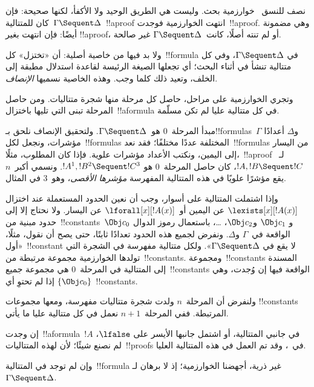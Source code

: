 \documentclass[../../../include/open-logic-section]{subfiles}
\begin{document}


نصف للنسق~ خوارزمية بحث. وليست هي الطريق الوحيد ولا الأكفأ،
لكنها صحيحة: فإن كان للمتتالية~$\Gamma\Sequent\Delta$~!!a{proof} انتهت
الخوارزمية فوجدت~!!a{proof}. وهي مضمونة أيضًا: فإن انتهت بغير
!!a{proof}، أو لم تنته أصلًا، كانت~$\Gamma\Sequent\Delta$ غير صالحة.

ولا بد فيها من خاصية أصلية: أن «تختزل» كل~!!{formula} في
$\Gamma\Sequent\Delta$، وفي كل متتالية تنشأ في أثناء البحث؛ أي تجعلها
الصيغة الرئيسة لقاعدة استدلال مطبقة إلى الخلف، وتعيد ذلك كلما وجب. وهذه
الخاصية نسميها \emph{الإنصاف}.

وتجري الخوارزمية على مراحل، حاصل كل مرحلة منها شجرة متتاليات. ومن حاصل
المرحلة تبنى التي تليها باختزال~!!a{formula} في كل متتالية عليا لم تكن
مسلّمة.

مبدأ المرحلة~$0$ هو~$\Gamma\Sequent\Delta$. ولتحقيق الإنصاف نلحق
بـ!!{formula}s~$\Gamma$ و$\Delta$ أعدادًا مؤشرات، ونجعل لكل~!!{formula}s
المختلفة عددًا مختلفًا؛ فقد نعد~!!{formula}s من اليسار إلى اليمين، ونكتب
الأعداد مؤشرات علوية. فإذا كان المطلوب، مثلًا،~!!a{proof}
لـ~$!A,!B\Sequent !C$، كان حاصل المرحلة~$0$ هو
$!A^1,!B^2\Sequent !C^3$. ونسمي أكبر~$n$ يقع مؤشرًا علويًا في هذه
المتتالية المفهرسة \emph{مؤشرها الأقصى}، وهو~$3$ في المثال.

وإذا اشتملت المتتالية على أسوار، وجب أن نعين الحدود المستعملة عند اختزال
$\lexists[x][!A(x)]$ عن اليمين أو~$\lforall[x][!A(x)]$ عن اليسار.
ولا نحتاج إلا إلى حدود مبنية من~!!{constant}s~$\Obj c_0$ و
$\Obj c_1$ و$\Obj c_2$، \dots، باستعمال رموز الدوال الواقعة في~$\Gamma$
و$\Delta$. ونفرض لجميع هذه الحدود تعدادًا ثابتًا، حتى يصح أن نقول، مثلًا،
«أول~!!{constant} لا يقع في
$\Gamma\Sequent\Delta$». ولكل متتالية مفهرسة في الشجرة التي تولدها
الخوارزمية مجموعة مرتبطة من~!!{constant}s. ومجموعة~!!{constant}s المسندة إلى المتتالية
في المرحلة~$0$ هي مجموعة جميع~!!{constant}s الواقعة فيها إن وُجدت، وهي
$\{\Obj c_0\}$ إذا لم تحتوِ أي~!!{constant}s.

ولنفرض أن المرحلة~$n$ ولدت شجرة متتاليات مفهرسة، ومعها مجموعات
!!{constant}s المرتبطة. ففي المرحلة~$n+1$ نعمل في كل متتالية عليا ما يأتي.

إن وجدت~!!a{formula}~$!A$ في جانبي المتتالية، أو اشتمل جانبها الأيسر على
$\lfalse$، لم نصنع شيئًا؛ لأن لهذه المتتاليات~!!{proof}s في~،
وقد تم العمل في هذه المتتالية العليا.

وإن لم توجد في المتتالية~!!{formula} غير ذرية، أجهضنا الخوارزمية؛ إذ لا
برهان لـ~$\Gamma\Sequent\Delta$.
\end{document}
